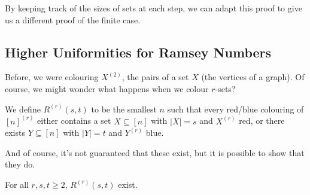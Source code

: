 \documentclass[a4paper]{scrartcl}
\begin{document}
\begin{remark}
	By keeping track of the sizes of sets at each step, we can adapt this proof to give us a different proof of the finite case.
\end{remark}

\subsection{Higher Uniformities for Ramsey Numbers}

Before, we were colouring $X^{(2)}$, the pairs of a set $X$ (the vertices of a graph). Of course, we might wonder what happens when we colour $r$-sets?

\begin{definition}
	We define $R^{(r)}(s, t)$ to be the smallest $n$ such that every red/blue colouring of $[n]^{(r)}$ either contains a set $X \subseteq [n]$ with $|X| = s$ and $X^(r)$ red, or there exists $Y \subseteq[n]$ with $|Y| = t$ and $Y^{(r)}$ blue.
\end{definition}

And of course, it's not guaranteed that these exist, but it is possible to show that they do.

\begin{theorem}
	For all $r, s, t \geq 2$, $R^{(r)}(s, t)$ exist.
\end{theorem}
\end{document}

